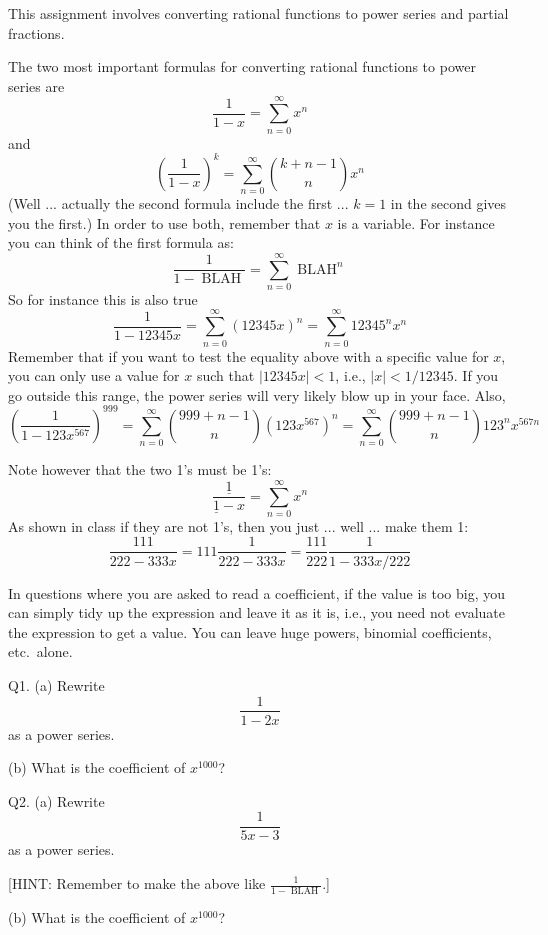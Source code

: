 \documentclass[a4paper,12pt]{article}
\begin{document}
\topmatter

This assignment involves converting rational functions to 
power series and partial fractions.

The two most important formulas for converting rational functions to 
power series are
\[
\frac{1}{1-x} = \sum_{n=0}^\infty x^n
\]
and
\[
\left(
\frac{1}{1-x}
\right)^k
= \sum_{n=0}^\infty \binom{k+n-1}{n} x^n
\]
(Well ... actually the second formula include the first ... $k=1$ in
the second gives you the first.)
In order to use both, remember that $x$ is a variable.
For instance you can think of the first formula as:
\[
\frac{1}{1- \operatorname{BLAH}} = \sum_{n=0}^\infty \operatorname{BLAH}^n
\]
So for instance this is also true
\[
\frac{1}{1- 12345x} 
= \sum_{n=0}^\infty (12345x)^n
= \sum_{n=0}^\infty 12345^n x^n
\]
Remember that if you want to test the equality above
with a specific value for $x$, you can only use a 
value for $x$ such that $|12345x| < 1$, i.e., $|x| < 1/12345$.
If you go outside this range, the power series will very likely blow up 
in your face.
Also,
\[
\left(
\frac{1}{1-123x^{567}}
\right)^{999}
= \sum_{n=0}^\infty \binom{999+n-1}{n} (123x^{567})^n
= \sum_{n=0}^\infty \binom{999+n-1}{n} 123^n x^{567n}
\]

Note however that the two 1's must be 1's:
\[
\frac{\underline{1}}{\underline{1}-x} = \sum_{n=0}^\infty x^n
\]
As shown in class if they are not 1's, then you just ... well ... make them 1:
\[
\frac{111}{222-333x} 
= 111 \frac{1}{222-333x} 
= \frac{111}{222} \frac{1}{1 -333x/222} 
\]

In questions where you are asked to read a coefficient, if the value is too
big, you can simply tidy up the expression and leave it as it is, i.e.,
you need not evaluate the expression to get a value. 
You can leave huge powers, binomial coefficients, etc.~alone.


\newpage
Q1. (a) Rewrite
\[
\frac{1}{1 - 2x}
\]
as a power series. 

(b) What is the coefficient of $x^{1000}$?

\SOLUTION


\newpage




Q2.
(a) Rewrite
\[
\frac{1}{5x - 3}
\]
as a power series. 

[HINT: Remember to make the above like $\frac{1}{1 - \operatorname{BLAH}}$.]

(b) What is the coefficient of $x^{1000}$?

\SOLUTION
\end{document}
